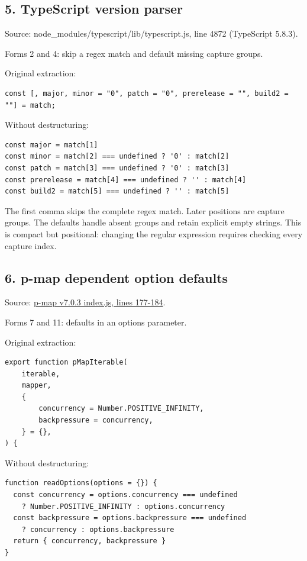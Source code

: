 \documentclass[
  10pt,
  a4paper,
]{article}
\begin{document}
\subsection{5. TypeScript version
parser}\label{5-typescript-version-parser}

Source: node\_modules/typescript/lib/typescript.js, line 4872
(TypeScript 5.8.3).

Forms 2 and 4: skip a regex match and default missing capture groups.

Original extraction:

\begin{lstlisting}
const [, major, minor = "0", patch = "0", prerelease = "", build2 = ""] = match;
\end{lstlisting}

Without destructuring:

\begin{lstlisting}
const major = match[1]
const minor = match[2] === undefined ? '0' : match[2]
const patch = match[3] === undefined ? '0' : match[3]
const prerelease = match[4] === undefined ? '' : match[4]
const build2 = match[5] === undefined ? '' : match[5]
\end{lstlisting}

The first comma skips the complete regex match. Later positions are
capture groups. The defaults handle absent groups and retain explicit
empty strings. This is compact but positional: changing the regular
expression requires checking every capture index.

\subsection{6. p-map dependent option
defaults}\label{6-p-map-dependent-option-defaults}

Source:
\href{https://github.com/sindresorhus/p-map/blob/c9831c7a9b7baa6e986428cc7f1c83af694b5c8e/index.js\#L177}{p-map
v7.0.3 index.js, lines 177-184}.

Forms 7 and 11: defaults in an options parameter.

Original extraction:

\begin{lstlisting}
export function pMapIterable(
    iterable,
    mapper,
    {
        concurrency = Number.POSITIVE_INFINITY,
        backpressure = concurrency,
    } = {},
) {
\end{lstlisting}

Without destructuring:

\begin{lstlisting}
function readOptions(options = {}) {
  const concurrency = options.concurrency === undefined
    ? Number.POSITIVE_INFINITY : options.concurrency
  const backpressure = options.backpressure === undefined
    ? concurrency : options.backpressure
  return { concurrency, backpressure }
}
\end{lstlisting}
\end{document}

